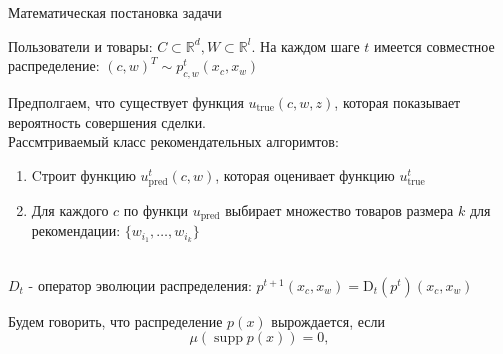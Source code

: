 \documentclass{beamer}
\DeclareMathOperator\supp{supp}
\begin{document}
\begin{frame}{Математическая постановка задачи}
 \scriptsize{Пользователи  и товары: $C \subset \mathbb{R}^d, W \subset \mathbb{R}^l$. На каждом шаге $t$ имеется совместное распределение: $(c, w)^T \sim p^{t}_{c,w} (x_c , x_w )$
 
\item
Предполгаем, что существует функция $u_{\text{true}}(c, w, z)$, которая показывает вероятность совершения сделки. \\
Рассмтриваемый класс рекомендательных алгоримтов: 
\begin{enumerate}
    \item Cтроит функцию  $u^t_{\text{pred}}(c, w)$, которая оценивает функцию $u^t_{\text{true}}$
    \item Для каждого $c$ по функци $u_{\text{pred}}$ выбирает множество товаров размера $k$ для рекомендации: $\{w_{i_1},\ldots, w_{i_k}\}$
\end{enumerate}}
\\$D_t$ - оператор эволюции распределения:
$p^{t + 1}(x_c, x_w) = \text{D}_t(p^{t})(x_c, x_w)$

Будем говорить, что распределение $p(x)$ вырождается, если 
$$
\mu (\supp p(x)) = 0,
$$

    \begin{columns}[c]
        
\end{columns}
\end{frame}
\end{document}

